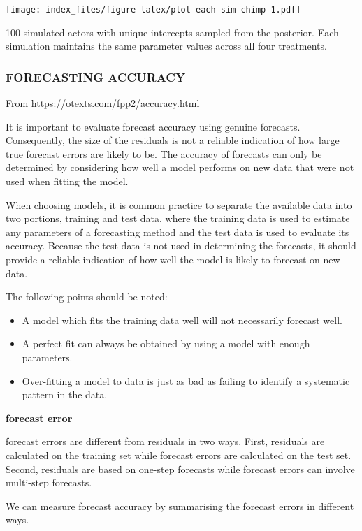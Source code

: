 \documentclass[
]{article}
\begin{document}
\texttt{[image: index\_files/figure-latex/plot each sim chimp-1.pdf]}

100 simulated actors with unique intercepts sampled from the posterior.
Each simulation maintains the same parameter values across all four
treatments.

\hypertarget{forecasting-accuracy}{%
\subsubsection{FORECASTING ACCURACY}\label{forecasting-accuracy}}

From \url{https://otexts.com/fpp2/accuracy.html}

It is important to evaluate forecast accuracy using genuine forecasts.
Consequently, the size of the residuals is not a reliable indication of
how large true forecast errors are likely to be. The accuracy of
forecasts can only be determined by considering how well a model
performs on new data that were not used when fitting the model.

When choosing models, it is common practice to separate the available
data into two portions, training and test data, where the training data
is used to estimate any parameters of a forecasting method and the test
data is used to evaluate its accuracy. Because the test data is not used
in determining the forecasts, it should provide a reliable indication of
how well the model is likely to forecast on new data.

The following points should be noted:

\begin{itemize}
\item
  A model which fits the training data well will not necessarily
  forecast well.
\item
  A perfect fit can always be obtained by using a model with enough
  parameters.
\item
  Over-fitting a model to data is just as bad as failing to identify a
  systematic pattern in the data.
\end{itemize}

\textbf{forecast error}

forecast errors are different from residuals in two ways. First,
residuals are calculated on the training set while forecast errors are
calculated on the test set. Second, residuals are based on one-step
forecasts while forecast errors can involve multi-step forecasts.

We can measure forecast accuracy by summarising the forecast errors in
different ways.
\end{document}
